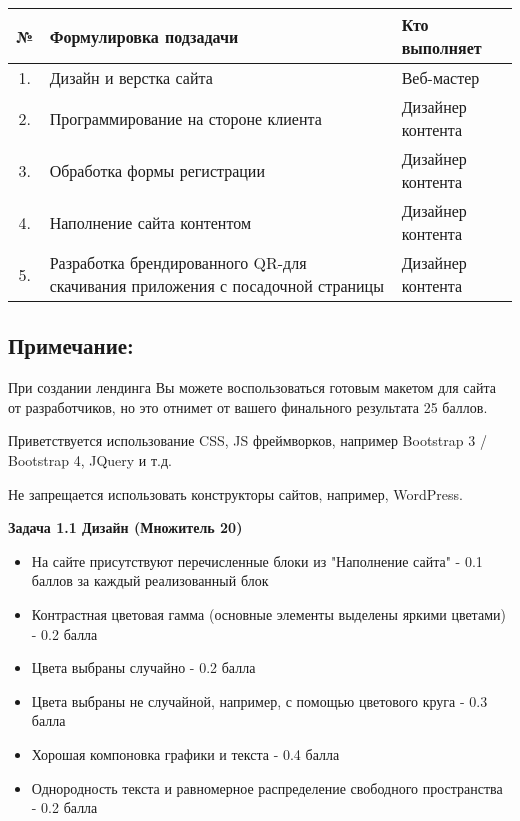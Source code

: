 \begin{table}[H]
    \begin{center}
        \begin{tabular}{|c|p{8cm}|l|}
            \hline
            № & Формулировка подзадачи& Кто выполняет \\
            \hline
            1.& Дизайн и верстка сайта& Веб-мастер\\
            \hline
            2.& Программирование на стороне клиента& Дизайнер контента\\
            \hline
            3.& Обработка формы регистрации& Дизайнер контента\\
            \hline
            4.& Наполнение сайта контентом& Дизайнер контента\\
            \hline
            5.& Разработка брендированного QR-для скачивания приложения с посадочной страницы& Дизайнер контента \\
            \hline           
        \end{tabular}
    \end{center}
\end{table}

\subsection*{Примечание:}

При создании лендинга Вы можете воспользоваться готовым макетом для сайта от разработчиков, но это отнимет от вашего финального результата 25 баллов.

Приветствуется использование CSS, JS фреймворков, например Bootstrap 3 / Bootstrap 4, JQuery и т.д.

Не запрещается использовать конструкторы сайтов, например, WordPress.

\markSection

\textbf{Задача 1.1 Дизайн (Множитель 20)}
\begin{itemize}
    \item На сайте присутствуют перечисленные блоки из "Наполнение сайта" - 0.1 баллов за каждый реализованный блок
    \item Контрастная цветовая гамма (основные элементы выделены яркими цветами) - 0.2 балла
    \item Цвета выбраны случайно - 0.2 балла
    \item Цвета выбраны не случайной, например, с помощью цветового круга - 0.3 балла
    \item Хорошая компоновка графики и текста - 0.4 балла
    \item Однородность текста и равномерное распределение свободного пространства - 0.2 балла
\end{itemize}

